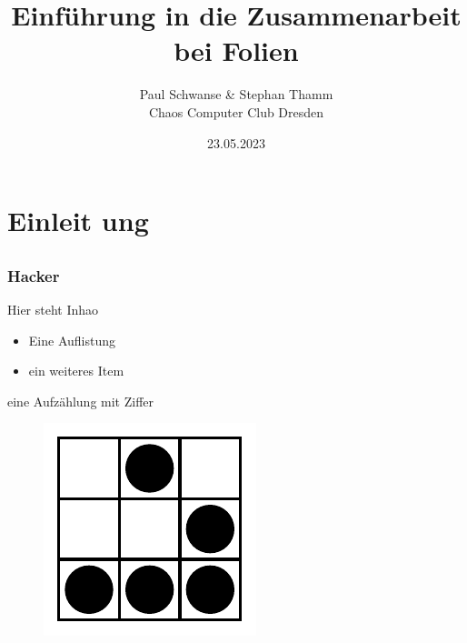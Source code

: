 \documentclass[12pt]{beamer}
\title{Einführung in die Zusammenarbeit bei Folien}
\author{\small Paul Schwanse \& Stephan Thamm\\\large Chaos Computer Club Dresden}
\date{23.05.2023}
\begin{document}
\maketitle

\section{Einleit ung}
\subsection{} 

\begin{frame}
  \frametitle{Hacker}
  Hier steht Inhao
  \begin{itemize}
	  \item Eine Auflistung
	  \item ein weiteres Item
  \end{itemize}
  \begin{enumeration}
	  \item eine Aufzählung mit Ziffer
  \end{enumeration}
  \begin{figure}
    \includegraphics[height=0.7\textheight]{img/Glider.pdf}
  \end{figure}
\end{frame}
\end{document}
